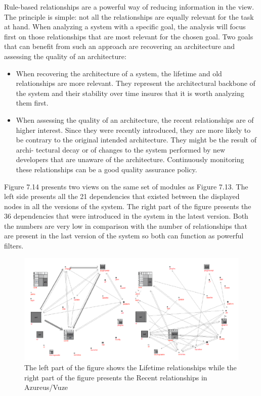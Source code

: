 \documentclass[preprint,12pt]{elsarticle}
\begin{document}
Rule-based relationships are a powerful way of reducing information in the view. The principle is simple: not all the relationships are equally relevant for the task at hand. When analyzing a system with a specific goal, the analysis will focus first on those relationships that are most relevant for the chosen goal. Two goals that can benefit from such an approach are recovering an architecture and assessing the quality of an architecture:

\begin{itemize}
\item When recovering the architecture of a system, the lifetime and old relationships are more relevant. They represent the architectural backbone of the system and their stability over time insures that it is worth analyzing them first.

\item When assessing the quality of an architecture, the recent relationships are of higher interest. Since they were recently introduced, they are more likely to be contrary to the original intended architecture. They might be the result of archi- tectural decay or of changes to the system performed by new developers that are unaware of the architecture. Continuously monitoring these relationships can be a good quality assurance policy.
\end{itemize}

Figure 7.14 presents two views on the same set of modules as Figure 7.13. The left side presents all the 21 dependencies that existed between the displayed nodes in all the versions of the system. The right part of the figure presents the 36 dependencies that were introduced in the system in the latest version. Both the numbers are very low in comparison with the number of relationships that are present in the last version of the system so both can function as powerful filters.

\begin{figure}[h]
\begin{center}
\includegraphics[width=0.8\linewidth]{images/Architecture-LifetimeVsRecent}
\caption{The left part of the figure shows the Lifetime relationships while the right part of the figure presents the Recent relationships in Azureus/Vuze}
\label{}
\end{center}
\end{figure}
\end{document}
